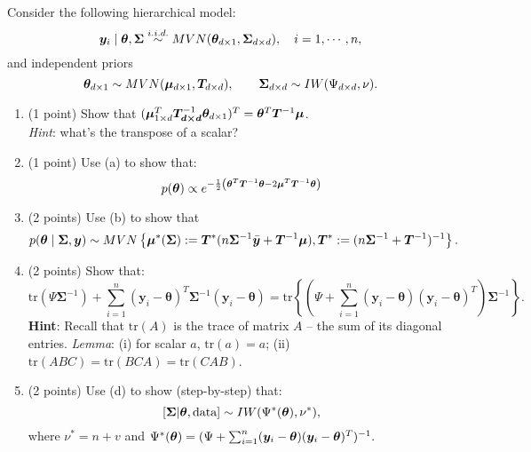 \documentclass{article}
\newcommand{\bSigma}{\boldsymbol{\Sigma}}
\begin{document}
\begin{enumerate}
Consider the following hierarchical model:
\[ \bm{y}_i \mid \btheta,\bSigma \stackrel{i.i.d.}{\sim} MVN(\btheta_{d \times 1},\bSigma_{d \times d}), \quad i = 1, \cdots, n, \]
and independent priors $$\btheta_{d \times 1} \sim MVN(\bmu_{d \times 1},\bm{T}_{d \times d}), 
\qquad \bSigma_{d \times d} \sim IW(\Psi_{d \times d},\nu).$$
\begin{enumerate}
\item (1 point) Show that $(\bm{\mu}_{1 \times d}^T \bm{T_{d \times d}}^{-1}{\bm\theta}_{d \times 1})^T = {\bm\theta}^T \bm{T}^{-1} \bm{\mu}$.\\
\textit{Hint}: what's the transpose of a scalar?
\item (1 point) Use (a) to show that:
\[ p({\bm\theta}) \propto e^{-\frac{1}{2}\left({\bm\theta}^T\bm{T}^{-1}{\bm\theta} - 2\bm{\mu}^T\bm{T}^{-1}{\bm\theta} \right)} \]
\item (2 points) Use (b) to show that
$$ p(\btheta \mid \bSigma, \bm{y} )
\sim MVN\left\{\bmu^*(\bSigma) := {\bm{T}^*}(n \boldsymbol{\Sigma}^{-1}\bar{\bm{y}} + \bm{T}^{-1}\bmu), \bm{T}^* := ( n\boldsymbol{\Sigma}^{-1} + \bm{T}^{-1})^{-1}\right\}. $$
\item (2 points) Show that:
\[ \text{tr}(\Psi\boldsymbol{\Sigma}^{-1})+\sum_{i=1}^n (\bm{y}_i-\boldsymbol{\theta})^T \boldsymbol{\Sigma}^{-1}(\bm{y}_i-\boldsymbol{\theta}) = \text{tr}\left\{\left(\Psi + \sum_{i=1}^n (\bm{y}_i-\boldsymbol{\theta}) (\bm{y}_i-\boldsymbol{\theta})^T \right) \boldsymbol{\Sigma}^{-1}\right\}.\]
\textbf{Hint}: Recall that $\text{tr}(A)$ is the trace of matrix $A$ -- the sum of its diagonal entries. \textit{Lemma}: (i) for scalar $a$, $\text{tr}(a)=a$; (ii) $\text{tr}(ABC) = \text{tr}(BCA) = \text{tr}(CAB)$.
\item (2 points) Use (d) to show (step-by-step) that:
\[ [\bSigma|\btheta,\text{data}] \sim IW(\Psi^*(\btheta),\nu^*),\]
where $\nu^* = n + v$ and $\Psi^*({\bm\theta}) = (\Psi + \sum_{i=1}^n (\bm{y}_i-\boldsymbol{\theta}) (\bm{y}_i-\boldsymbol{\theta})^T)^{-1} .$
\end{enumerate}
\end{enumerate}
\end{document}
